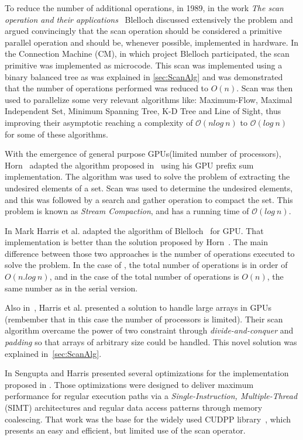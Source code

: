 \documentclass[Ingles]{ic-tese-v1}
\newcommand{\tit}[1]{{\textit{#1}}}
\begin{document}
To reduce the number of additional operations, in 1989, in the work \textit{The scan operation and their applications}~\cite{ScanAsPrimitive} Blelloch discussed extensively the problem and argued convincingly that the scan operation should be considered a primitive parallel operation and should be, whenever 	possible, implemented in hardware. In the Connection Machine (CM), in which project  Blelloch participated, the scan primitive was implemented as microcode. This scan was  implemented using a binary balanced tree as was explained in  \ref{sec:ScanAlg} and was demonstrated that the number of operations performed was reduced to $O(n)$.  Scan was  then used  to parallelize   some  very  relevant   algorithms  like: Maximum-Flow, Maximal Independent Set, Minimum Spanning Tree, K-D Tree and Line  of Sight, thus improving their asymptotic reaching a complexity of $\mathcal{O}(n log\ n)$ to $\mathcal{O}(log\ n)$ for some of these algorithms.

With the emergence of general purpose GPUs(limited number of processors), Horn~\cite{GPUGems2} adapted the algorithm proposed in~\cite{dataparallel} using his GPU prefix sum implementation. The algorithm was used  to solve the problem of extracting the undesired elements of a set. Scan  was used to determine  the undesired elements, and this was followed by a search and  gather   operation  to   compact the set.  This   problem  is   known  as \textit{Stream   Compaction},  and has a running  time   of $\mathcal{O}(log\ n)$.

In \cite{harris2007parallel} Mark Harris  et al. adapted the algorithm of Blelloch~\cite{ScanAsPrimitive} for GPU. That  implementation is better than
the solution  proposed by Horn~\cite{GPUGems2}. The  main difference between those two approaches is the number of operations executed to
solve the problem. In the case of \cite{GPUGems2}, the total number of operations is in order of $O(n.log\ n)$, and in the case of \cite{harris2007parallel}
the  total number  of operations  is $O(n)$,  the same  number as  in the serial version.

Also in~\cite{harris2007parallel}, Harris et al. presented a solution  to handle large arrays in GPUs (rembember that in this case the
number of processors is limited). Their scan algorithm overcame the power of two constraint through \tit{divide-and-conquer} and \tit{padding}
so that arrays of arbitrary size could be handled. This novel solution was explained in~\ref{sec:ScanAlg}.

In   \cite{Sengupta:2008}  Sengupta and  Harris presented  several
optimizations     for      the     implementation      proposed     in
\cite{harris2007parallel}. Those  optimizations   were  designed  to
deliver  maximum  performance  for regular  execution  paths  via  a
\textit{Single-Instruction,  Multiple-Thread} (SIMT) architectures and
regular data access patterns through memory coalescing.  That work was
the  base  for  the  widely  used  CUDPP  library~\cite{CUDPP},  which
presents an easy and efficient, but limited use of the scan operator.
\end{document}
